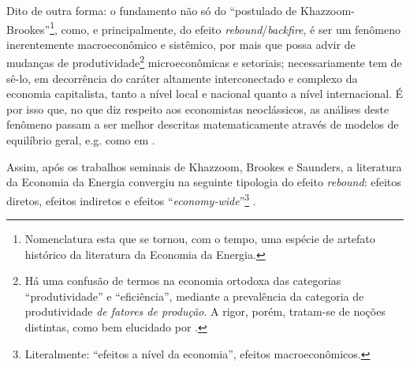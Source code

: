 Dito de outra forma: o fundamento não só do ``postulado de Khazzoom-Brookes''\footnote{Nomenclatura esta que se tornou, com o tempo, uma espécie de artefato histórico da literatura da Economia da Energia.}, como, e principalmente, do efeito \textit{rebound}/\textit{backfire}, é ser um fenômeno inerentemente macroeconômico e sistêmico, por mais que possa advir de mudanças de produtividade\footnote{Há uma confusão de termos na economia ortodoxa das categorias ``produtividade'' e ``eficiência'', mediante a prevalência da categoria de produtividade \textit{de fatores de produção}. A rigor, porém, tratam-se de noções distintas, como bem elucidado por \textcite{SaBarreto2022}.%
} microeconômicas e setoriais; necessariamente tem de sê-lo, em decorrência do caráter altamente interconectado e complexo da economia capitalista, tanto a nível local e nacional quanto a nível internacional. É por isso que, no que diz respeito aos economistas neoclássicos, as análises deste fenômeno passam a ser melhor descritas matematicamente através de modelos de equilíbrio geral, e.g. como em \textcite{Hanley2009}.

Assim, após os trabalhos seminais de Khazzoom, Brookes e Saunders, a literatura da Economia da Energia convergiu na seguinte tipologia do efeito \textit{rebound}: efeitos diretos, efeitos indiretos e efeitos ``\textit{economy-wide}''\footnote{Literalmente: ``efeitos a nível da economia'', efeitos macroeconômicos.} \parencite{Greening2000, Sorrell2009,Sorrell2010, Gillingham2015}.

